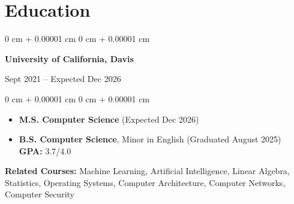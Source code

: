 \documentclass[10pt, letterpaper]{article}
\newenvironment{highlights}{
    \begin{itemize}[
        topsep=0.10 cm,
        parsep=0.10 cm,
        partopsep=0pt,
        itemsep=0pt,
        leftmargin=0 cm + 10pt
    ]
}{
    \end{itemize}
} %
\newenvironment{highlightsforbulletentries}{
    \begin{itemize}[
        topsep=0.10 cm,
        parsep=0.10 cm,
        partopsep=0pt,
        itemsep=0pt,
        leftmargin=10pt
    ]
}{
    \end{itemize}
} %
\newenvironment{onecolentry}{
    \begin{adjustwidth}{
        0 cm + 0.00001 cm
    }{
        0 cm + 0.00001 cm
    }
}{
    \end{adjustwidth}
} %
\newenvironment{twocolentry}[2][]{
    \onecolentry
    \def\secondColumn{#2}
    \setcolumnwidth{\fill, 6 cm}
    \begin{paracol}{2}
}{
    \switchcolumn \raggedleft \secondColumn
    \end{paracol}
    \endonecolentry
} %
\begin{document}
    









    \section{Education}



        
        \begin{twocolentry}{
            Sept 2021 – Expected Dec 2026
        }
            \textbf{University of California, Davis}
            
        \end{twocolentry}

        \vspace{0.10 cm}
        \begin{onecolentry}
            \begin{highlights}
                \item \textbf{M.S. Computer Science} (Expected Dec 2026)
                \item \textbf{B.S. Computer Science}, Minor in English (Graduated August 2025) \textbf{GPA: } 3.7/4.0
            \end{highlights}
            \textbf{Related Courses: } Machine Learning, Artificial Intelligence, Linear Algebra, Statistics, Operating Systems, Computer Architecture, Computer Networks, Computer Security
        \end{onecolentry}
\end{document}
